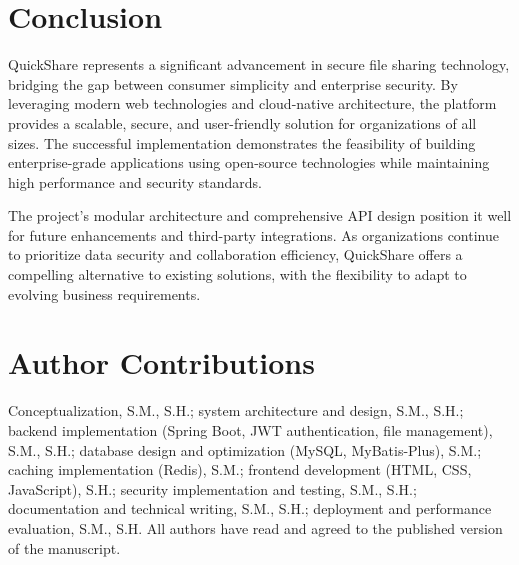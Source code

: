 \documentclass[final]{cvpr}
\begin{document}
\section{Conclusion}

QuickShare represents a significant advancement in secure file sharing technology, bridging the gap between consumer simplicity and enterprise security. By leveraging modern web technologies and cloud-native architecture, the platform provides a scalable, secure, and user-friendly solution for organizations of all sizes. The successful implementation demonstrates the feasibility of building enterprise-grade applications using open-source technologies while maintaining high performance and security standards.

The project's modular architecture and comprehensive API design position it well for future enhancements and third-party integrations. As organizations continue to prioritize data security and collaboration efficiency, QuickShare offers a compelling alternative to existing solutions, with the flexibility to adapt to evolving business requirements.

\section{Author Contributions}

Conceptualization, S.M., S.H.; system architecture and design, S.M., S.H.; backend implementation (Spring Boot, JWT authentication, file management), S.M., S.H.; database design and optimization (MySQL, MyBatis-Plus), S.M.; caching implementation (Redis), S.M.; frontend development (HTML, CSS, JavaScript), S.H.; security implementation and testing, S.M., S.H.; documentation and technical writing, S.M., S.H.; deployment and performance evaluation, S.M., S.H. All authors have read and agreed to the published version of the manuscript.


{\small


}
\end{document}
